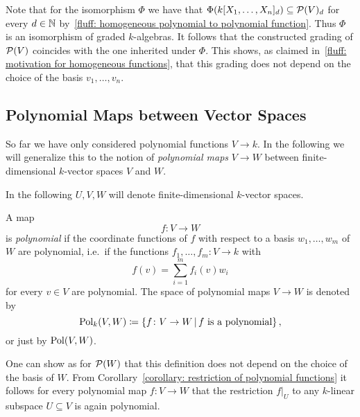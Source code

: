 \begin{fluff}
  Note that for the isomorphism $\Phi$ we have that $\Phi( k[X_1, \dotsc, X_n]_d ) \subseteq \mathcal{P}(V)_d$ for every $d \in \mathbb{N}$ by~\ref{fluff: homogeneous polynomial to polynomial function}.
  Thus $\Phi$ is an isomorphism of graded $k$-algebras.
  It follows that the constructed grading of $\mathcal{P}(V)$ coincides with the one inherited under $\Phi$.
  This shows, as claimed in~\ref{fluff: motivation for homogeneous functions}, that this grading does not depend on the choice of the basis $v_1, \dotsc, v_n$.
\end{fluff}







\subsection{Polynomial Maps between Vector Spaces}

\begin{fluff}
  So far we have only considered polynomial functions $V \to k$.
  In the following we will generalize this to the notion of \emph{polynomial maps} $V \to W$ between finite-dimensional $k$-vector spaces $V$ and $W$.
\end{fluff}


\begin{conventions}
  In the following $U, V, W$ will denote finite-dimensional $k$-vector spaces.
\end{conventions}


\begin{definition}
  A map
  \[
            f
    \colon  V
    \to     W
  \]
  is \emph{polynomial} if the coordinate functions of $f$ with respect to a basis $w_1, \dotsc, w_m$ of $W$ are polynomial, i.e.\ if the functions $f_1, \dotsc, f_m \colon V \to k$ with
  \[
      f(v)
    = \sum_{i=1}^m f_i(v) w_i
  \]
  for every $v \in V$ are polynomial.
  The space of polynomial maps $V \to W$ is denoted by
  \[
              \Pol_k(V,W)
    \defined  \{
                        f
                \colon  V
                \to     W
              \suchthat
                \text{$f$ is a polynomial}
              \} \,,
  \]
  or just by $\operatorname{Pol}(V,W)$.
\end{definition}


\begin{remark}
  One can show as for $\mathcal{P}(W)$ that this definition does not depend on the choice of the basis of $W$.
  From Corollary~\ref{corollary: restriction of polynomial functions} it follows for every polynomial map $f \colon V \to W$ that the restriction $f|_U$ to any $k$-linear subspace $U \subseteq V$ is again polynomial.
\end{remark}


